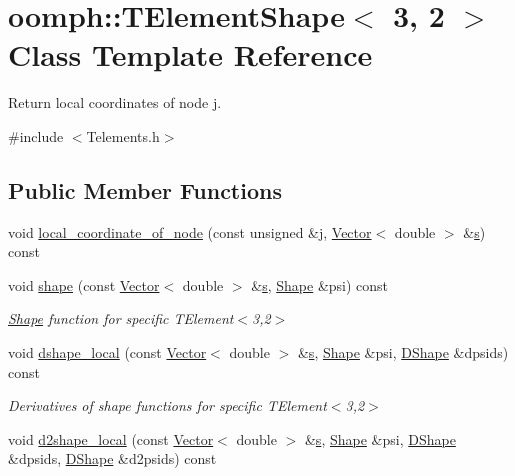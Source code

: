 \hypertarget{classoomph_1_1TElementShape_3_013_00_012_01_4}{}\section{oomph\+:\+:T\+Element\+Shape$<$ 3, 2 $>$ Class Template Reference}
\label{classoomph_1_1TElementShape_3_013_00_012_01_4}


Return local coordinates of node j.  




{\ttfamily \#include $<$Telements.\+h$>$}

\subsection*{Public Member Functions}
\begin{DoxyCompactItemize}
\item 
void \hyperlink{classoomph_1_1TElementShape_3_013_00_012_01_4_a505b9c977fc4d5dcb2366440fb619482}{local\+\_\+coordinate\+\_\+of\+\_\+node} (const unsigned \&j, \hyperlink{classoomph_1_1Vector}{Vector}$<$ double $>$ \&\hyperlink{cfortran_8h_ab7123126e4885ef647dd9c6e3807a21c}{s}) const
\item 
void \hyperlink{classoomph_1_1TElementShape_3_013_00_012_01_4_af7ddd0378cfdad4cfd24d7089ee859b6}{shape} (const \hyperlink{classoomph_1_1Vector}{Vector}$<$ double $>$ \&\hyperlink{cfortran_8h_ab7123126e4885ef647dd9c6e3807a21c}{s}, \hyperlink{classoomph_1_1Shape}{Shape} \&psi) const
\begin{DoxyCompactList}\small\item\em \hyperlink{classoomph_1_1Shape}{Shape} function for specific T\+Element$<$3,2$>$ \end{DoxyCompactList}\item 
void \hyperlink{classoomph_1_1TElementShape_3_013_00_012_01_4_ae1f8f28b63ff3a35f8bb8d460b651938}{dshape\+\_\+local} (const \hyperlink{classoomph_1_1Vector}{Vector}$<$ double $>$ \&\hyperlink{cfortran_8h_ab7123126e4885ef647dd9c6e3807a21c}{s}, \hyperlink{classoomph_1_1Shape}{Shape} \&psi, \hyperlink{classoomph_1_1DShape}{D\+Shape} \&dpsids) const
\begin{DoxyCompactList}\small\item\em Derivatives of shape functions for specific T\+Element$<$3,2$>$ \end{DoxyCompactList}\item 
void \hyperlink{classoomph_1_1TElementShape_3_013_00_012_01_4_ae89c2c44ccb5033bc958080a9693a972}{d2shape\+\_\+local} (const \hyperlink{classoomph_1_1Vector}{Vector}$<$ double $>$ \&\hyperlink{cfortran_8h_ab7123126e4885ef647dd9c6e3807a21c}{s}, \hyperlink{classoomph_1_1Shape}{Shape} \&psi, \hyperlink{classoomph_1_1DShape}{D\+Shape} \&dpsids, \hyperlink{classoomph_1_1DShape}{D\+Shape} \&d2psids) const
\end{DoxyCompactItemize}


